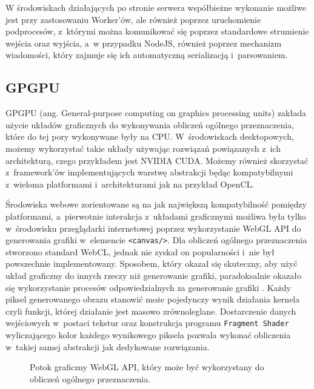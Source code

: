 W środowiskach działających po stronie serwera współbieżne wykonanie możliwe jest przy zastosowaniu Worker'ów, ale również poprzez uruchomienie podprocesów, z~którymi można komunikować się poprzez standardowe strumienie wejścia oraz wyjścia, a~w przypadku NodeJS, również poprzez mechanizm wiadomości, który zajmuje się ich automatyczną serializacją i~parsowaniem. 
 
\subsection{GPGPU}

GPGPU (ang. General-purpose computing on graphics processing units) zakłada użycie układów graficznych do wykonywania obliczeń ogólnego przeznaczenia, które do tej pory wykonywane były na CPU. W~środowiskach desktopowych, możemy wykorzystać takie układy używając rozwiązań powiązanych z~ich architekturą, czego przykładem jest NVIDIA CUDA. Możemy również skorzystać z~framework'ów implementujących warstwę abstrakcji będąc kompatybilnymi z~wieloma platformami i~architekturami jak na przykład OpenCL. 

Środowiska webowe zorientowane są na jak największą kompatybilność pomiędzy platformami, a~pierwotnie interakcja z~układami graficznymi możliwa była tylko w~środowisku przeglądarki internetowej poprzez wykorzystanie WebGL API do generowania grafiki w~elemencie \lstinline{<canvas/>}. Dla obliczeń ogólnego przeznaczenia stworzono standard WebCL, jednak nie zyskał on popularności i~nie był powszechnie implementowany. Sposobem, który okazał się skuteczny, aby użyć układ graficzny do innych rzeczy niż generowanie grafiki, paradoksalnie okazało się wykorzystanie procesów odpowiedzialnych za generowanie grafiki \cite{sapuan2018general}. Każdy piksel generowanego obrazu stanowić może pojedynczy wynik działania kernela czyli funkcji, której działanie jest masowo zrównoleglane. Dostarczenie danych wejściowych w~postaci tekstur oraz konstrukcja programu \texttt{Fragment Shader} wyliczającego kolor każdego wynikowego piksela pozwala wykonać obliczenia w~takiej samej abstrakcji jak dedykowane rozwiązania. 

\begin{figure}
    \centering
    
    \caption{Potok graficzny WebGL API, który może być wykorzystany do obliczeń ogólnego przeznaczenia.}
    \label{fig:webgl-pipeline}
\end{figure}

